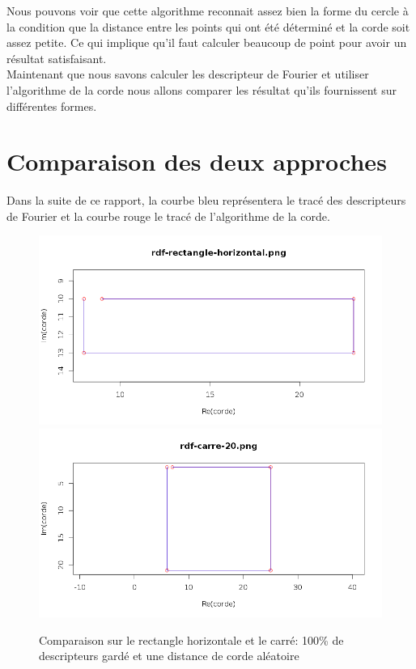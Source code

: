 \documentclass[11pt]{article}
\begin{document}
  Nous pouvons voir que cette algorithme reconnait assez bien la forme du cercle à la
  condition que la distance entre les points qui ont été déterminé et la corde soit assez
  petite. Ce qui implique qu'il faut calculer beaucoup de point pour avoir un résultat
  satisfaisant.\\
  
  Maintenant que nous savons calculer les descripteur de Fourier et utiliser l'algorithme
  de la corde nous allons comparer les résultat qu'ils fournissent sur différentes formes.
  
  \section{Comparaison des deux approches}
  Dans la suite de ce rapport, la courbe bleu représentera le tracé des descripteurs de Fourier
  et la courbe rouge le tracé de l'algorithme de la corde. 
  
   \begin{center}
    \begin{figure}[!h]
      \includegraphics[width=15cm]{../resultat/comp_rect.png}
      \includegraphics[width=15cm]{../resultat/comp_carre.png}
      \caption{Comparaison sur le rectangle horizontale et le carré: 100\% de descripteurs gardé et une distance de corde aléatoire}
    \end{figure}
  \end{center}
  
\end{document}
